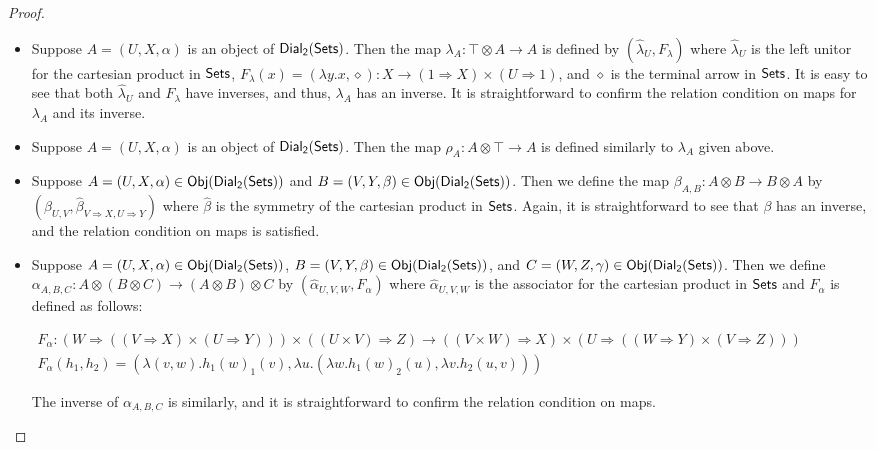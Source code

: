 \begin{proof}
\begin{center}
\begin{itemize}
    \item Suppose $A = (U,X,\alpha)$ is an object of $\mathsf{Dial_2}(\mathsf{Sets})$.  Then
      the map $\lambda_A : \top \otimes A \to A$ is defined by
      $(\hat{\lambda}_U,F_\lambda)$ where
      $\hat{\lambda}_U$ is the left unitor for the cartesian product in $\mathsf{Sets}$,
      $F_\lambda(x) = (\lambda y.x,\diamond) : X \to (1 \Rightarrow X)
      \times (U \Rightarrow 1)$, and $\diamond$ is the terminal arrow in $\mathsf{Sets}$.
      It is easy to see that both
      $\hat{\lambda}_U$ and $F_\lambda$ have
      inverses, and thus, $\lambda_A$ has an inverse. It is straightforward to confirm the relation condition on maps
      for $\lambda_A$ and its inverse.

    \item Suppose $A = (U,X,\alpha)$ is an object of $\mathsf{Dial_2}(\mathsf{Sets})$.  Then
      the map $\rho_A : A \otimes \top \to A$ is defined similarly to
      $\lambda_A$ given above.

    \item Suppose $A = (U,X,\alpha) \in \mathsf{Obj}(\mathsf{Dial_2}(\mathsf{Sets}))$ and
      $B = (V,Y,\beta) \in \mathsf{Obj}(\mathsf{Dial_2}(\mathsf{Sets}))$.  Then we define the map
      $\beta_{A,B} : A \otimes B \to B \otimes A$ by
      $(\hat{\beta}_{U,V}, \hat{\beta}_{V \Rightarrow X,U \Rightarrow
        Y})$
      where $\hat{\beta}$ is the symmetry of the cartesian product in
      $\mathsf{Sets}$.  Again, it is straightforward to see that $\beta$ has
      an inverse, and the relation condition on maps is satisfied.

    \item Suppose $A = (U,X,\alpha) \in \mathsf{Obj}(\mathsf{Dial_2}(\mathsf{Sets}))$,
      $B = (V,Y,\beta) \in \mathsf{Obj}(\mathsf{Dial_2}(\mathsf{Sets}))$, and
      $C = (W,Z,\gamma) \in \mathsf{Obj}(\mathsf{Dial_2}(\mathsf{Sets}))$.  Then we define
      $\alpha_{A,B,C} : A \otimes (B \otimes C) \to (A \otimes B)
      \otimes C$
      by $(\hat{\alpha}_{U,V,W}, F_\alpha)$ where
      $\hat{\alpha}_{U,V,W}$ is the associator for the cartesian
      product in $\mathsf{Sets}$ and $F_\alpha$ is defined as follows:
      \begin{center}
        \scriptsize
        \begin{math}
          \begin{array}{lll}
            F_\alpha : (W \Rightarrow ((V \Rightarrow X) \times (U \Rightarrow Y))) \times ((U \times V) \Rightarrow Z) \to 
            ((V \times W) \Rightarrow X) \times (U \Rightarrow ((W \Rightarrow Y) \times (V \Rightarrow Z)))\\
            F_\alpha(h_1,h_2) = (\lambda (v,w).h_1(w)_1(v),\lambda u.(\lambda w.h_1(w)_2(u),\lambda v.h_2(u,v)))
          \end{array}
        \end{math}
      \end{center}
      The inverse of $\alpha_{A,B,C}$ is similarly, and it is
      straightforward to confirm the relation condition on maps.


\end{itemize}
\end{center}
\end{proof}
